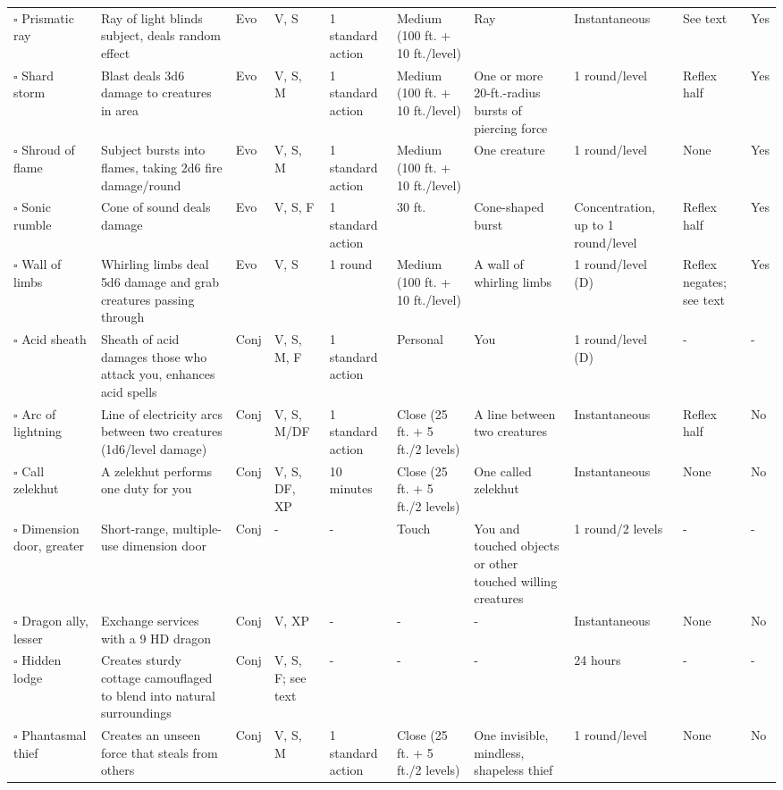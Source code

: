 \documentclass[12pt, a4paper]{article}
\begin{document}
\begin{center}
\begin{longtable}[H]{ p{8em} p{15em} p{2em} p{5em} p{6em} p{6em} p{10em} p{6em} p{5em} p{2em} }
    \(\square\) Prismatic ray & Ray of light blinds subject, deals random effect & Evo & V, S & 1 standard action & Medium (100 ft. + 10 ft./level) & Ray & Instantaneous & See text & Yes\\
    \(\square\) Shard storm & Blast deals 3d6 damage to creatures in area & Evo & V, S, M & 1 standard action & Medium (100 ft. + 10 ft./level) & One or more 20-ft.-radius bursts of piercing force & 1 round/level & Reﬂex half & Yes\\
    \(\square\) Shroud of flame & Subject bursts into ﬂames, taking 2d6 ﬁre damage/round & Evo & V, S, M & 1 standard action & Medium (100 ft. + 10 ft./level) & One creature & 1 round/level & None & Yes\\
    \(\square\) Sonic rumble & Cone of sound deals damage & Evo & V, S, F & 1 standard action & 30 ft. & Cone-shaped burst & Concentration, up to 1 round/level & Reﬂex half & Yes\\
    \(\square\) Wall of limbs & Whirling limbs deal 5d6 damage and grab creatures passing through & Evo & V, S & 1 round & Medium (100 ft. + 10 ft./level) & A wall of whirling limbs  & 1 round/level (D) & Reﬂex negates; see text & Yes\\
    \(\square\) Acid sheath & Sheath of acid damages those who attack you, enhances acid spells & Conj & V, S, M, F & 1 standard action & Personal & You & 1 round/level (D) & - & -\\
    \(\square\) Arc of lightning & Line of electricity arcs between two creatures (1d6/level damage) & Conj & V, S, M/DF & 1 standard action & Close (25 ft. + 5 ft./2 levels) & A line between two creatures & Instantaneous & Reﬂex half & No\\
    \(\square\) Call zelekhut & A zelekhut performs one duty for you & Conj & V, S, DF, XP & 10 minutes & Close (25 ft. + 5 ft./2 levels) & One called zelekhut & Instantaneous & None & No\\
    \(\square\) Dimension door, greater & Short-range, multiple-use dimension door & Conj & - & - & Touch & You and touched objects or other touched willing creatures & 1 round/2 levels & - & -\\
    \(\square\) Dragon ally, lesser & Exchange services with a 9 HD dragon & Conj & V, XP & - & - & - & Instantaneous & None & No\\
    \(\square\) Hidden lodge & Creates sturdy cottage camouﬂaged to blend into natural surroundings & Conj & V, S, F; see text & - & - & - & 24 hours & - & -\\
    \(\square\) Phantasmal thief & Creates an unseen force that steals from others & Conj & V, S, M & 1 standard action & Close (25 ft. + 5 ft./2 levels) & One invisible, mindless, shapeless thief & 1 round/level & None & No\\

\end{longtable}
\end{center}
\end{document}
